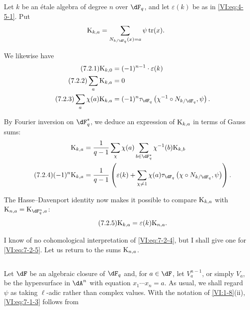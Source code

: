 \documentclass[oneside]{book}
\DeclareMathOperator{\tr}{tr}
\newcommand{\kloos}{\textnormal{K}} %
\theoremstyle{sga-source}
\theoremstyle{sga-source-dash}
\theoremstyle{sga-source-dotdash}
\theoremstyle{sga-source-number-note-dash}
\theoremstyle{sga-source-note-number-dotdash}
\theoremstyle{sga-source-example-dotdash}
\theoremstyle{sga-source-inline-number}
\theoremstyle{sga-source-bare-number}
\theoremstyle{sga-source}
\newcommand{\PrintPage}[1]{}\newcommand{\MathPage}[1]{}\newcommand{\PrintCite}[2]{#1}\newcommand{\var}[3]{#2}
\begin{document}
\subsection{}\label{VI:7-2}

Let $k$ be an étale algebra of degree $n$ over $\dF_q$, and let $\varepsilon(k)$ 
be as in \eqref{VI:eq:4-5-1}. Put 
\[
  \kloos_{k,a} = \sum_{N_{k/\dF_q}(x)=a} \psi \tr(x) \text{.} 
\]
\PrintPage{220}
We likewise have 
\begin{align*}\tag{7.2.1}\label{VI:eq:7-2-1}
  \kloos_{k,0} &= (-1)^{n-1} \cdot \varepsilon(k) \\ \tag{7.2.2}\label{VI:eq:7-2-2}
  \sum_a \kloos_{k,a} &= 0 \\ \tag{7.2.3}\label{VI:eq:7-2-3}
  \sum_a \chi(a) \kloos_{k,a} &= (-1)^n \tau_{\dF_q}\left(\chi^{-1}\circ N_{k/\dF_q},\psi\right) \text{.} 
\end{align*}

By Fourier inversion on $\dF_q^\ast$, we deduce an expression of 
$\kloos_{k,a}$ in terms of Gauss sums: 
\begin{align*} 
  \kloos_{k,a} &= \frac{1}{q-1} \sum_\chi \chi(a) \sum_{b\in \dF_q^\ast} \chi^{-1}(b) \kloos_{k,b} \\ \tag{7.2.4}\label{VI:eq:7-2-4}
  (-1)^n \kloos_{k,a} &= \frac{1}{q-1} \left(\varepsilon(k) + \sum_{\chi\ne 1} \chi(a) \tau_{\dF_q}\left(\chi\circ N_{k/\dF_q},\psi\right) \right) \text{.} 
\end{align*}

The Hasse--Davenport identity now makes it possible to compare $\kloos_{k,a}$ 
with $\kloos_{n,a} = \var{\kloos_{\dF_{q^n},a}}{\kloos_{\dF_q^n,a}}{S45-SOL-0934}$: 
\begin{equation*}\tag{7.2.5}\label{VI:eq:7-2-5}
  \kloos_{k,a} = \varepsilon(k) \kloos_{n,a} \text{.} 
\end{equation*}

I know of no cohomological interpretation of \eqref{VI:eq:7-2-4}, but 
I shall give one for \eqref{VI:eq:7-2-5}. Let us return to the sums $\kloos_{n,a}$. 





\subsection{}\label{VI:7-3}

Let $\dF$ be an algebraic closure of $\dF_q$ and, for $a\in \dF$, let 
$V_a^{n-1}$, or simply $V_a$, be the hypersurface in $\dA^n$ with equation 
$x_1 \dotsm x_n=a$. As usual, we shall regard $\psi$ as taking 
$\ell$-adic rather than complex values. With the notation of 
\ref{VI:1-8}(ii), \eqref{VI:eq:7-1-3} follows from 
\end{document}
